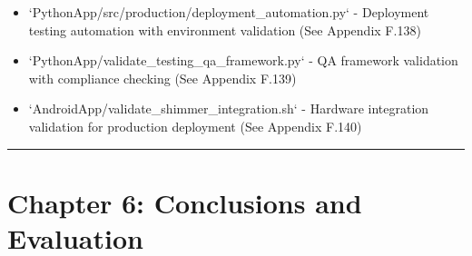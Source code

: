 \documentclass[12pt,a4paper]{report}
\begin{document}
\begin{itemize}
\item `PythonApp/src/production/deployment_automation.py` - Deployment testing automation with environment validation (See
  Appendix F.138)
\item `PythonApp/validate_testing_qa_framework.py` - QA framework validation with compliance checking (See Appendix F.139)
\item `AndroidApp/validate_shimmer_integration.sh` - Hardware integration validation for production deployment (See Appendix
  F.140)

\end{itemize}
\hrule

\section{Chapter 6: Conclusions and Evaluation}
\end{document}
